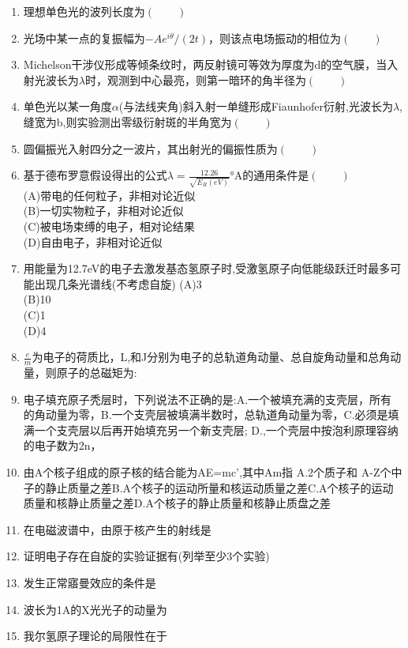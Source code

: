 \begin{enumerate}
(D)右旋椭圆偏振光
\item 理想单色光的波列长度为$(\qquad)$
\item 光场中某一点的复振幅为$-Ae^{i\theta}/ (2t)$，则该点电场振动的相位为$(\qquad)$
\item Michelson干涉仪形成等倾条纹时，两反射镜可等效为厚度为d的空气膜，当入射光波长为$\lambda$时，观测到中心最亮，则第一暗环的角半径为$(\qquad)$
\item 单色光以某一角度$\alpha$(与法线夹角)斜入射一单缝形成Fiaunhofer衍射,光波长为$\lambda$,缝宽为b,则实验测出零级衍射斑的半角宽为$(\qquad)$
\item 圆偏振光入射四分之一波片，其出射光的偏振性质为$(\qquad)$
\item 基于德布罗意假设得出的公式$\lambda=\frac{12.26}{\sqrt{E_R(eV)}}$°A的通用条件是$(\qquad)$\\
(A)带电的任何粒子，非相对论近似\\
(B)一切实物粒子，非相对论近似\\
(C)被电场束缚的电子，相对论结果\\
(D)自由电子，非相对论近似
\item 用能量为12.7eV的电子去激发基态氢原子时,受激氢原子向低能级跃迁时最多可能出现几条光谱线(不考虑自旋)
(A)3\\
(B)10\\
(C)1\\
(D)4
\item $\frac{e}{m}$为电子的荷质比，L,和J分别为电子的总轨道角动量、总自旋角动量和总角动量，则原子的总磁矩为:
\item 电子填充原子秃层时，下列说法不正确的是:A.一个被填充满的支壳层，所有的角动量为零，B.一个支壳层被填满半数时，总轨道角动量为零，C.必须是填满一个支壳层以后再开始填充另一个新支壳层;
D.,一个壳层中按泡利原理容纳的电子数为2n，
\item 由A个核子组成的原子核的结合能为AE=mc’,其中Am指
A.2个质子和 A-Z个中子的静止质量之差B.A个核子的运动所量和核运动质量之差C.A个核子的运动质量和核静止质量之差D.A个核子的静止质量和核静止质盘之差
\item 在电磁波谱中，由原于核产生的射线是
\item 证明电子存在自旋的实验证据有(列举至少3个实验)
\item 发生正常寤曼效应的条件是
\item 波长为1A的X光光子的动量为
\item 我尔氢原子理论的局限性在于
\end{enumerate}
